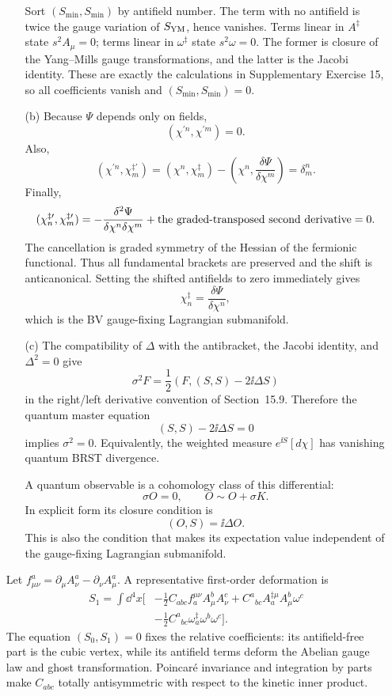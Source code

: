 \begin{enumerate}
\begin{enumerate}
    Sort \((S_{\min},S_{\min})\) by antifield number.  The term with no
    antifield is twice the gauge variation of \(S_{\rm YM}\), hence vanishes.
    Terms linear in \(A^\ddagger\) state
    \(s^2A_\mu=0\); terms linear in \(\omega^\ddagger\) state
    \(s^2\omega=0\).  The former is closure of the Yang--Mills gauge
    transformations, and the latter is the Jacobi identity.  These are
    exactly the calculations in Supplementary Exercise 15, so all
    coefficients vanish and \((S_{\min},S_{\min})=0\).
    \item[(b)]
    Because \(\Psi\) depends only on fields,
    \[
      (\chi^{\prime n},\chi^{\prime m})=0.
    \]
    Also,
    \[
      (\chi^{\prime n},\chi_m^{\ddagger\prime})
        =(\chi^n,\chi_m^\ddagger)
         -\left(\chi^n,\frac{\delta\Psi}{\delta\chi^m}\right)
        =\delta^n_m.
    \]
    Finally,
    \[
      (\chi_n^{\ddagger\prime},\chi_m^{\ddagger\prime})
        =-\frac{\delta^2\Psi}{\delta\chi^n\delta\chi^m}
         +\hbox{the graded-transposed second derivative}=0.
    \]
    The cancellation is graded symmetry of the Hessian of the fermionic
    functional.  Thus all fundamental brackets are preserved and the shift is
    anticanonical.  Setting the shifted antifields to zero immediately gives
    \[
      \chi_n^\ddagger=\frac{\delta\Psi}{\delta\chi^n},
    \]
    which is the BV gauge-fixing Lagrangian submanifold.
    \item[(c)]
    The compatibility of \(\Delta\) with the antibracket, the Jacobi identity,
    and \(\Delta^2=0\) give
    \[
      \sigma^2F
        =\frac12\left(F,(S,S)-2\ii\Delta S\right)
    \]
    in the right/left derivative convention of Section~15.9.  Therefore the
    quantum master equation
    \[
      (S,S)-2\ii\Delta S=0
    \]
    implies \(\sigma^2=0\).  Equivalently, the weighted measure
    \(e^{\ii S}[d\chi]\) has vanishing quantum BRST divergence.

    A quantum observable is a cohomology class of this differential:
    \[
      \sigma O=0,\qquad O\sim O+\sigma K.
    \]
    In explicit form its closure condition is
    \[
      (O,S)=\ii\Delta O.
    \]
    This is also the condition that makes its expectation value independent
    of the gauge-fixing Lagrangian submanifold.
  \end{enumerate}

  Let \(f^a_{\mu\nu}=\partial_\mu A^a_\nu-\partial_\nu A^a_\mu\).
  A representative first-order deformation is
  \[
    \begin{split}
    S_1=\int \dd^4x\bigg[
      &-\frac12 C_{abc}f_a^{\mu\nu}A^b_\mu A^c_\nu
       +C^a{}_{bc}A_a^{\ddagger\mu}A^b_\mu\omega^c\\
      &-\frac12C^a{}_{bc}\omega_a^\ddagger
        \omega^b\omega^c\bigg].
    \end{split}
  \]
  The equation \((S_0,S_1)=0\) fixes the relative coefficients: its
  antifield-free part is the cubic vertex, while its antifield terms deform
  the Abelian gauge law and ghost transformation.  Poincaré invariance and
  integration by parts make \(C_{abc}\) totally antisymmetric with respect
  to the kinetic inner product.


\end{enumerate}
